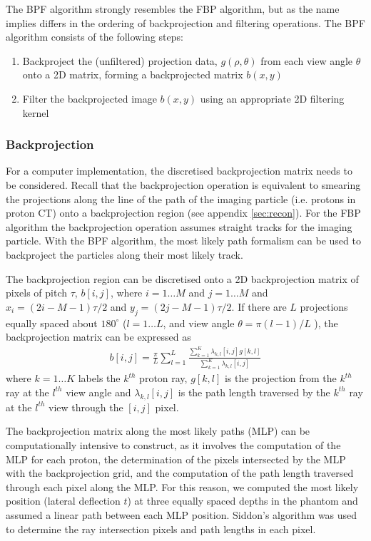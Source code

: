 \documentclass[11pt,a4paper]{article}
\begin{document}
The BPF algorithm strongly resembles the FBP algorithm, but as the name implies differs in the ordering of backprojection and filtering operations. The BPF algorithm consists of the following steps:
\begin{enumerate}
\item Backproject the (unfiltered) projection data, $g(\rho,\theta)$ from each view angle $\theta$ onto a 2D matrix, forming a backprojected matrix $b(x,y)$
\item Filter the backprojected image $b(x,y)$ using an appropriate 2D filtering kernel
\end{enumerate}

\subsubsection{Backprojection}

For a computer implementation, the discretised backprojection matrix needs to be considered. Recall that the backprojection operation is equivalent to smearing the projections along the line of the path of the imaging particle (i.e. protons in proton CT) onto a backprojection region (see appendix \ref{sec:recon}). For the FBP algorithm the backprojection operation assumes straight tracks for the imaging particle. With the BPF algorithm, the most likely path formalism can be used to backproject the particles along their most likely track.

The backprojection region can be discretised onto a 2D backprojection matrix of pixels of pitch $\tau$, $b[i,j]$, where $i = 1 \dots M$ and $j = 1 \dots M$ and $x_{i} = (2i - M - 1)\tau/2$ and $y_j = (2j - M - 1)\tau/2$. If there are $L$ projections equally spaced about $180^{\circ}$ ($l = 1 \dots L$, and view angle $\theta = \pi (l-1)/L$ ), the backprojection matrix can be expressed as 
\begin{eqnarray}
b[i,j] = \frac{\pi}{L}\sum_{l=1}^L \frac{\sum_{k=1}^K \lambda_{k,l}[i,j] g[k,l]}{\sum_{k=1}^{K} \lambda_{k,l}[i,j]}
\end{eqnarray}
where $k=1 \dots K$ labels the $k^{th}$ proton ray, $g[k,l]$ is the projection from the $k^{th}$ ray at the $l^{th}$ view angle and $\lambda_{k,l}[i,j]$ is the path length traversed by the $k^{th}$ ray at the $l^{th}$ view through the $[i,j]$ pixel. 

The backprojection matrix along the most likely paths (MLP) can be computationally intensive to construct, as it involves the computation of the MLP for each proton, the determination of the pixels intersected by the MLP with the backprojection grid, and the computation of the path length traversed through each pixel along the MLP. For this reason, we computed the most likely position (lateral deflection $t$) at three equally spaced depths in the phantom and assumed a linear path between each MLP position. Siddon's algorithm \cite{siddon1985fast} was used to determine the ray intersection pixels and path lengths in each pixel.
\end{document}
